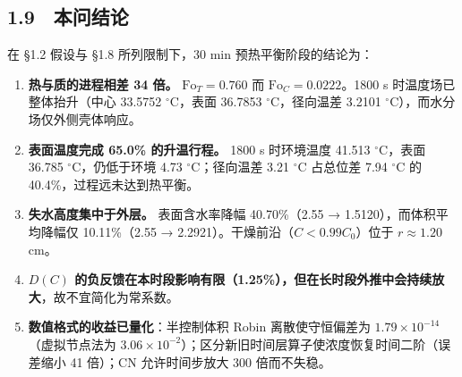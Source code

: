 \documentclass[12pt,a4paper]{ctexart}
\begin{document}
\subsection*{1.9　本问结论}

在 §1.2 假设与 §1.8 所列限制下，30 min 预热平衡阶段的结论为：

\begin{enumerate}[label=\arabic*.]
\item \textbf{热与质的进程相差 34 倍。} $\mathrm{Fo}_T=0.760$ 而 $\mathrm{Fo}_C=0.0222$。1800 s 时温度场已整体抬升（中心 33.5752 $^\circ$C，表面 36.7853 $^\circ$C，径向温差 3.2101 $^\circ$C），而水分场仅外侧壳体响应。
\item \textbf{表面温度完成 65.0\% 的升温行程。} 1800 s 时环境温度 41.513 $^\circ$C，表面 36.785 $^\circ$C，仍低于环境 4.73 $^\circ$C；径向温差 3.21 $^\circ$C 占总位差 7.94 $^\circ$C 的 40.4\%，过程远未达到热平衡。
\item \textbf{失水高度集中于外层。} 表面含水率降幅 40.70\%（2.55 → 1.5120），而体积平均降幅仅 10.11\%（2.55 → 2.2921）。干燥前沿（$C<0.99C_0$）位于 $r\approx1.20$ cm。
\item \textbf{$D(C)$ 的负反馈在本时段影响有限（1.25\%），但在长时段外推中会持续放大}，故不宜简化为常系数。
\item \textbf{数值格式的收益已量化}：半控制体积 Robin 离散使守恒偏差为 $1.79\times10^{-14}$（虚拟节点法为 $3.06\times10^{-2}$）；区分新旧时间层算子使浓度恢复时间二阶（误差缩小 41 倍）；CN 允许时间步放大 300 倍而不失稳。
\end{enumerate}
\end{document}
